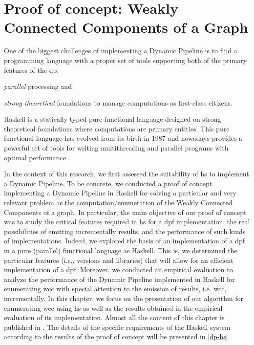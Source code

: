 \chapter{Proof of concept: Weakly Connected Components of a Graph}\label{prole}

One of the biggest challenges of implementing a Dynamic Pipeline is to find  a programming language with a proper set of tools supporting both of the  primary features of the \acrshort{dp}: \begin{inparaenum}[i\upshape)]
\item  \emph{parallel} processing and 
\item  \emph{strong theoretical} foundations to manage computations as first-class citizens.
 \end{inparaenum}
Haskell is a statically typed pure functional language designed on strong theoretical foundations where computations are primary entities.
This pure functional language has evolved from its birth in 1987 and nowadays provides a powerful set of tools for writing multithreading and parallel programs with optimal performance \cite{parallelbook, monadpar}. 

In the context of this research, we first assessed the suitability of \acrfull{hs}  to implement a Dynamic Pipeline. 
To be concrete, we conducted a proof of concept implementing a Dynamic Pipeline in  Haskell for solving a particular and very relevant problem as the computation/enumeration of the Weakly Connected Components of a graph.
In particular, the main objective of our proof of concept was to study the critical features required in \acrshort{hs} for a \acrshort{dpf} implementation,  the real possibilities of emitting incrementally results, and the performance of such kinds of implementations. 
Indeed, we explored the basis of an implementation of a \acrshort{dpf}  in a pure (parallel) functional language as Haskell.
This is, we determined the particular features (i.e., versions and libraries) that will allow for an efficient implementation of a \acrshort{dpf}. 
Moreover, we conducted an empirical evaluation to analyze the performance of the Dynamic Pipeline implemented in Haskell for enumerating \acrshort{wcc} with special attention to the emission of results, i.e. \acrshort{wcc}, incrementally. 
In this chapter, we focus on the presentation of our algorithm for enumerating \acrshort{wcc} using \acrshort{hs} as well as the results obtained in the empirical evaluation of its implementation. Almost all the content of this chapter is published in \cite{prole21}. 
The details of the specific requirements of the Haskell system according to the results of the proof of concept will be presented in \autoref{dp-hs}.
 
